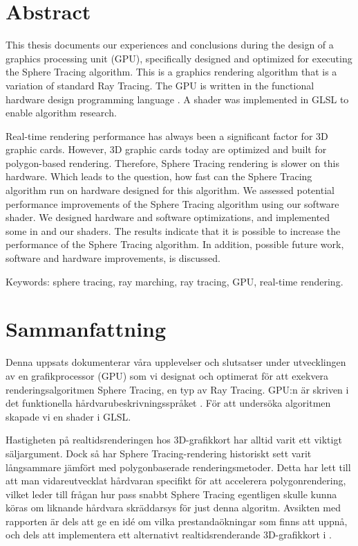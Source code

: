 \thispagestyle{plain}			%
\setlength{\parskip}{10pt}
\setlength{\parindent}{0pt}

\section*{Abstract}

	This thesis documents our experiences and conclusions during the design of  
	a graphics processing unit (GPU), specifically designed and optimized for 
	executing the Sphere Tracing algorithm. This is a graphics rendering 
	algorithm that is a variation of standard Ray Tracing. The GPU is written 
	in the functional hardware design programming language \clash. A shader was 
	implemented in GLSL to enable algorithm research.
	
	Real-time rendering performance has always been a significant factor for 3D
	graphic cards. However, 3D graphic cards today are optimized and built for
	polygon-based rendering. Therefore, Sphere Tracing rendering is slower on
	this hardware. Which leads to the question, how fast can the Sphere Tracing 
	algorithm run on hardware designed for this algorithm. We assessed 
	potential performance improvements of the Sphere Tracing algorithm using 
	our software shader. We designed hardware and software optimizations, and 
	implemented some in \clash and our shaders. The results indicate that it is 
	possible to increase the performance of the Sphere Tracing algorithm. In 
	addition, possible future work, software and hardware improvements, is 
	discussed.

	\vfill
	Keywords: sphere tracing, ray marching, ray tracing, GPU, real-time rendering.

\newpage
\thispagestyle{plain}

\section*{Sammanfattning}
	
	Denna uppsats dokumenterar våra upplevelser och slutsatser under 
	utvecklingen av en grafikprocessor (GPU) som vi	designat och optimerat 
	för att exekvera renderingsalgoritmen Sphere Tracing, en typ av Ray 
	Tracing. GPU:n är skriven i det funktionella hårdvarubeskrivningsspråket 
	\clash. För att undersöka algoritmen skapade vi en shader i GLSL.
	
	Hastigheten på realtidsrenderingen hos 3D-grafikkort har alltid varit ett
	viktigt säljargument. Dock så har Sphere Tracing-rendering historiskt sett 
	varit långsammare jämfört med polygonbaserade renderingsmetoder. Detta har 
	lett till att man vidareutvecklat hårdvaran specifikt för att accelerera 
	polygonrendering, vilket leder till frågan hur pass snabbt Sphere Tracing 
	egentligen skulle kunna köras om liknande hårdvara skräddarsys för just 
	denna algoritm. Avsikten med rapporten är dels att ge en idé om vilka 
	prestandaökningar som finns att uppnå, och dels att implementera ett
	alternativt realtidsrenderande 3D-grafikkort i \clash. 
	
